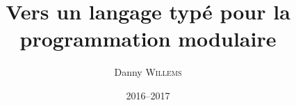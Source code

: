 \documentclass[10pt,a4paper]{memoire-umons}
\title{Vers un langage typé pour la programmation modulaire}
\author{Danny \textsc{Willems}}
\date{2016--2017}
\begin{document}
\newcommand{\localLetBinding}[3]{let \; #1 \; = \; #2 \; in \; #3}



\tableofcontents











%


\end{document}
